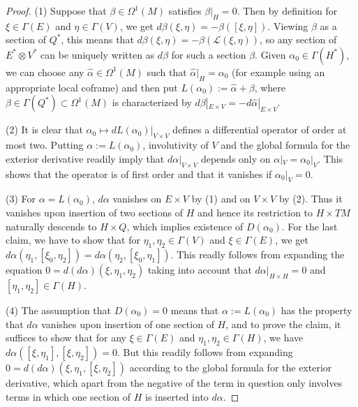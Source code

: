 \documentclass[11pt]{amsart}
\numberwithin{proposition}{section}
\numberwithin{equation}{section}
\begin{document}
\begin{proof}
    (1) Suppose that $\beta\in\Omega^1(M)$ satisfies $\beta|_H=0$. Then by definition for $\xi\in\Gamma(E)$ and $\eta\in\Gamma(V)$, we get $d\beta(\xi,\eta)=-\beta([\xi,\eta])$. Viewing $\beta$ as a section of $Q^*$, this means that $d\beta(\xi,\eta)=-\beta(\mathcal L(\xi,\eta))$, so any section of $E^*\otimes V^*$ can be uniquely written as $d\beta$ for such a section $\beta$. Given $\alpha_0\in\Gamma(H^*)$, we can choose any $\hat\alpha\in\Omega^1(M)$ such that $\hat\alpha|_H=\alpha_0$ (for example using an appropriate local coframe) and then put $L(\alpha_0):=\hat\alpha+\beta$, where $\beta\in\Gamma(Q^*)\subset\Omega^1(M)$ is characterized by $d\beta|_{E\times V}=-d\hat\alpha|_{E\times V}$. 

    (2) It is clear that $\alpha_0\mapsto dL(\alpha_0)|_{V\times V}$ defines a differential operator of order at most two. Putting $\alpha:=L(\alpha_0)$, involutivity of $V$ and the global formula for the exterior derivative readily imply that $d\alpha|_{V\times V}$ depends only on $\alpha|_V=\alpha_0|_V$. This shows that the operator is of first order and that it vanishes if $\alpha_0|_V=0$. 

    (3) For $\alpha=L(\alpha_0)$, $d\alpha$ vanishes on $E\times V$ by (1) and on $V\times V$ by (2). Thus it vanishes upon insertion of two sections of $H$ and hence its restriction to $H\times TM$ naturally descends to $H\times Q$, which implies existence of $D(\alpha_0)$. For the last claim, we have to show that for $\eta_1,\eta_2\in\Gamma(V)$ and $\xi\in\Gamma(E)$, we get $d\alpha(\eta_1,[\xi_0,\eta_2])=d\alpha(\eta_2,[\xi_0,\eta_1])$. This readly follows from expanding the equation $0=d(d\alpha)(\xi,\eta_1,\eta_2)$ taking into account that $d\alpha|_{H\times H}=0$ and $[\eta_1,\eta_2]\in\Gamma(H)$.  

    (4) The assumption that $D(\alpha_0)=0$ means that $\alpha:=L(\alpha_0)$ has the property that $d\alpha$ vanishes upon insertion of one section of $H$, and to prove the claim, it suffices to show that for any $\xi\in\Gamma(E)$ and $\eta_1,\eta_2\in\Gamma(H)$, we have $d\alpha([\xi,\eta_1],[\xi,\eta_2])=0$. But this readily follows from expanding $0=d(d\alpha)(\xi,\eta_1,[\xi,\eta_2])$ according to the global formula for the exterior derivative, which apart from the negative of the term in question only involves terms in which one section of $H$ is inserted into $d\alpha$. 
\end{proof}
\end{document}
